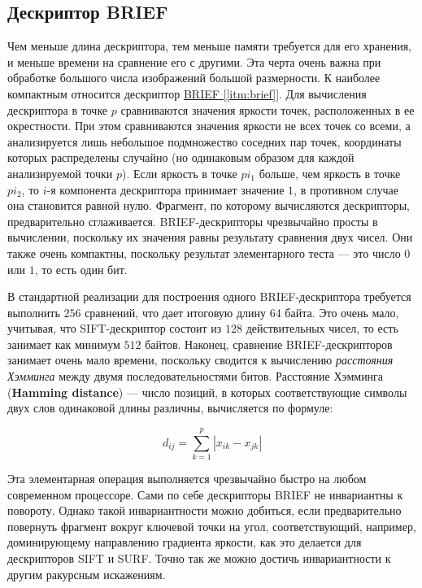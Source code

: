 \subsection{Дескриптор BRIEF}

Чем меньше длина дескриптора, тем меньше памяти требуется для его хранения, и меньше времени на сравнение его с другими. Эта черта очень важна при обработке большого числа изображений большой размерности. К наиболее компактным относится дескриптор \hyperref[itm:brief]{ BRIEF [\ref{itm:brief}]}. Для вычисления дескриптора в точке $p$ сравниваются значения яркости точек, расположенных в ее окрестности. При этом сравниваются значения яркости не всех точек со всеми, а анализируется лишь небольшое подмножество соседних пар точек, координаты которых распределены случайно (но одинаковым образом для каждой анализируемой точки $p$). Если яркость в точке $pi_1$ больше, чем яркость в точке $pi_2$, то $i$-я компонента дескриптора принимает значение $1$, в противном случае она становится равной нулю. Фрагмент, по которому вычисляются дескрипторы, предварительно сглаживается. BRIEF-дескрипторы чрезвычайно просты в вычислении, поскольку их значения равны результату сравнения двух чисел. Они также очень компактны, поскольку результат элементарного теста — это число $0$ или $1$, то есть один бит.

В стандартной реализации для построения одного BRIEF-дескриптора требуется выполнить $256$ сравнений, что дает итоговую длину $64$ байта. Это очень мало, учитывая, что SIFT-дескриптор состоит из $128$ действительных чисел, то есть занимает как минимум $512$ байтов. Наконец, сравнение BRIEF-дескрипторов занимает очень мало времени, поскольку сводится к вычислению \textit{расстояния Хэмминга} между двумя последовательностями битов. Расстояние Хэмминга (\textbf{Hamming distance}) — число позиций, в которых соответствующие символы двух слов одинаковой длины различны, вычисляется по формуле:

\begin{equation}
    d_{ij} = \sum_{k=1}^{p}|x_{ik} - x_{jk}|
\end{equation}

Эта элементарная операция выполняется чрезвычайно быстро на любом современном процессоре. Сами по себе дескрипторы BRIEF не инвариантны к повороту. Однако такой инвариантности можно добиться, если предварительно повернуть фрагмент вокруг ключевой точки на угол, соответствующий, например, доминирующему направлению градиента яркости, как это делается для дескрипторов SIFT и SURF. Точно так же можно достичь инвариантности к другим ракурсным искажениям.

